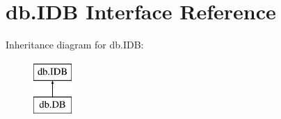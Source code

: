 \hypertarget{interfacedb_1_1_i_d_b}{}\section{db.\+I\+DB Interface Reference}
\label{interfacedb_1_1_i_d_b}
Inheritance diagram for db.\+I\+DB\+:\begin{figure}[H]
\begin{center}
\leavevmode
\includegraphics[height=2.000000cm]{interfacedb_1_1_i_d_b}
\end{center}
\end{figure}
